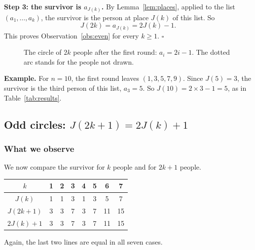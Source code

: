 \textbf{Step 3: the survivor is $a_{J(k)}$.} By Lemma~\ref{lem:places},
applied to the list $(a_1,\dots,a_k)$, the survivor is the person at place
$J(k)$ of this list. So
\[
J(2k)=a_{J(k)}=2J(k)-1 .
\]
This proves Observation~\ref{obs:even} for every $k\geq1$. \hfill$\square$

\begin{figure}[!ht]
\centering
\renewcommand{\nodesize}{7mm}\renewcommand{\nodefont}{\footnotesize}\footnotesize
{}
\caption{The circle of $2k$ people after the first round: $a_i=2i-1$. The
dotted arc stands for the people not drawn.}
\label{fig:even}
\end{figure}

\textbf{Example.} For $n=10$, the first round leaves $(1,3,5,7,9)$. Since
$J(5)=3$, the survivor is the third person of this list, $a_3=5$. So
$J(10)=2\times3-1=5$, as in Table~\ref{tab:results}.

\subsection{Odd circles: \texorpdfstring{$J(2k+1)=2J(k)+1$}{J(2k+1) = 2J(k) + 1}}

\subsubsection{What we observe}

We now compare the survivor for $k$ people and for $2k+1$ people.
\begin{center}
\renewcommand{\arraystretch}{1.2}
\begin{tabular}{|c|c|c|c|c|c|c|c|}
\hline
$k$ & 1 & 2 & 3 & 4 & 5 & 6 & 7\\ \hline
$J(k)$ & 1 & 1 & 3 & 1 & 3 & 5 & 7\\ \hline
$J(2k+1)$ & 3 & 3 & 7 & 3 & 7 & 11 & 15\\ \hline
$2J(k)+1$ & 3 & 3 & 7 & 3 & 7 & 11 & 15\\ \hline
\end{tabular}
\end{center}
Again, the last two lines are equal in all seven cases.

